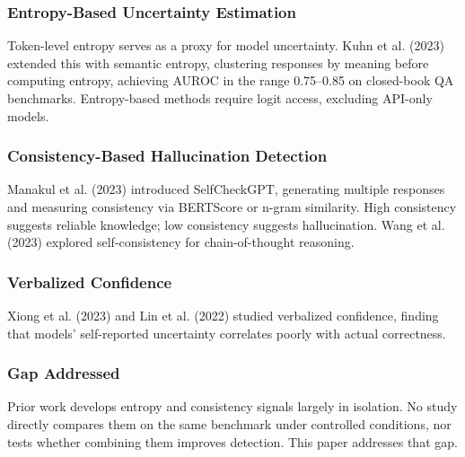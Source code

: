 
\subsubsection{Entropy-Based Uncertainty Estimation}

Token-level entropy serves as a proxy for model uncertainty. Kuhn et al. (2023) extended this with semantic entropy, clustering responses by meaning before computing entropy, achieving AUROC in the range 0.75--0.85 on closed-book QA benchmarks. Entropy-based methods require logit access, excluding API-only models.

\subsubsection{Consistency-Based Hallucination Detection}

Manakul et al. (2023) introduced SelfCheckGPT, generating multiple responses and measuring consistency via BERTScore or n-gram similarity. High consistency suggests reliable knowledge; low consistency suggests hallucination. Wang et al. (2023) explored self-consistency for chain-of-thought reasoning.

\subsubsection{Verbalized Confidence}

Xiong et al. (2023) and Lin et al. (2022) studied verbalized confidence, finding that models' self-reported uncertainty correlates poorly with actual correctness.

\subsubsection{Gap Addressed}

Prior work develops entropy and consistency signals largely in isolation. No study directly compares them on the same benchmark under controlled conditions, nor tests whether combining them improves detection. This paper addresses that gap.

